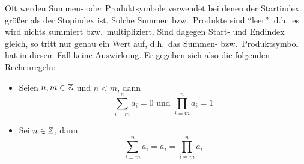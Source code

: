 Oft werden Summen- oder Produktsymbole verwendet bei denen der Startindex 
größer als der Stopindex ist. Solche Summen bzw.~Produkte sind "`leer"', 
d.h.~es wird nichts summiert bzw.~multipliziert. Sind dagegen Start- und
Endindex gleich, so tritt nur genau ein Wert auf, d.h.~das Summen- 
bzw.~Produktsymbol hat in diesem Fall keine Auswirkung. Er gegeben sich
also die folgenden Rechenregeln:
\begin{itemize}
%
\item Seien $n, m \in \mathbb Z$ und $n < m$, dann 
\begin{displaymath}
\sum_{i=m}^n a_i = 0  \text{ und } \prod_{i = m}^n a_i = 1
\end{displaymath}
%
\item Sei $n \in \mathbb Z$, dann 
\begin{displaymath}
\sum_{i=m}^n a_i = a_i = \prod_{i = m}^n a_i
\end{displaymath}
\end{itemize}



